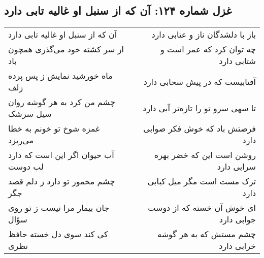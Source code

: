 \begin{center}
\section*{غزل شماره ۱۲۴: آن که از سنبل او غالیه تابی دارد}
\label{sec:sh124}
\begin{longtable}{l p{0.5cm} r}
آن که از سنبل او غالیه تابی دارد
&&
باز با دلشدگان ناز و عتابی دارد
\\
از سر کشته خود می‌گذری همچون باد
&&
چه توان کرد که عمر است و شتابی دارد
\\
ماه خورشید نمایش ز پس پرده زلف
&&
آفتابیست که در پیش سحابی دارد
\\
چشم من کرد به هر گوشه روان سیل سرشک
&&
تا سهی سرو تو را تازه‌تر آبی دارد
\\
غمزه شوخ تو خونم به خطا می‌ریزد
&&
فرصتش باد که خوش فکر صوابی دارد
\\
آب حیوان اگر این است که دارد لب دوست
&&
روشن است این که خضر بهره سرابی دارد
\\
چشم مخمور تو دارد ز دلم قصد جگر
&&
ترک مست است مگر میل کبابی دارد
\\
جان بیمار مرا نیست ز تو روی سؤال
&&
ای خوش آن خسته که از دوست جوابی دارد
\\
کی کند سوی دل خسته حافظ نظری
&&
چشم مستش که به هر گوشه خرابی دارد
\\
\end{longtable}
\end{center}
